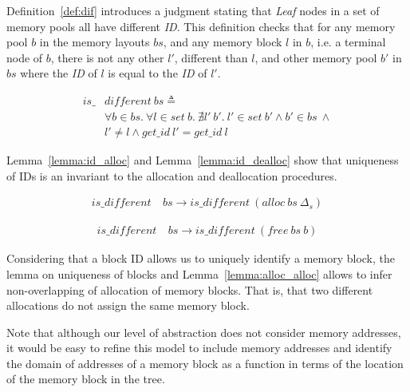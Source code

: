Definition~\ref{def:dif} introduces a judgment stating that \emph{Leaf} nodes in a set of memory pools all have different \emph{ID}. This definition checks that for any memory pool $b$ in the memory layouts $bs$, and any memory block $l$ in $b$, i.e. a terminal node of $b$, there is not any other $l'$, different than $l$, and other memory pool $b'$ in $bs$ where the \emph{ID} of $l$ is equal to the \emph{ID} of $l'$.

\begin{definition} 
\label{def:dif}
\end{definition}
\vspace{-7pt}
\begin{align*}
is\_&different\ bs \triangleq\\
&\forall b \in bs.\ \forall l \in set\ b.\ \nexists l'\ b'.\ l' \in set\ b' \wedge b' \in bs\ \wedge\\
&l' \ne l \wedge get\_id\ l' = get\_id\ l
\end{align*}
\vspace{-12pt}

Lemma~\ref{lemma:id_alloc} and Lemma~\ref{lemma:id_dealloc} show that uniqueness of IDs is an invariant to the allocation and deallocation procedures.

\begin{lemma}  \label{lemma:id_alloc}
\begin{align*}
is\_different\ &bs \longrightarrow is\_different\ (alloc\ bs\ \Delta_s)
\end{align*}
\end{lemma}

\begin{lemma}  \label{lemma:id_dealloc}
\begin{align*}
is\_different\ &bs \longrightarrow is\_different\ (free\ bs\ b)
\end{align*}
\end{lemma}

Considering that a block ID allows us to uniquely identify a memory block, the lemma on uniqueness of blocks and Lemma~\ref{lemma:alloc_alloc} allows to infer non-overlapping of allocation of memory blocks. That is, that two different allocations do not assign the same memory block.

Note that although our level of abstraction does not consider memory addresses, it would be easy to refine this model to include memory addresses and identify the domain of addresses of a memory block as a function in terms of the location of the memory block in the tree.

